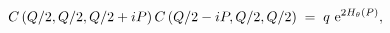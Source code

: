 \begin{equation}
\label{C_square}
C\left({Q}/{2},Q/2,Q/2+iP\right)
C\left(Q/2-iP,Q/2,Q/2\right)
 \; = \; 
q\ {\rm e}^{2H_\theta(P)},
\end{equation}

